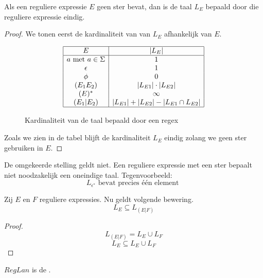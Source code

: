 \documentclass[main.tex]{subfiles}
\begin{document}
\begin{st}
  Als een reguliere expressie $E$ geen ster bevat, dan is de taal $L_{E}$ bepaald door die reguliere expressie eindig.
  
  \begin{proof}
    We tonen eerst de kardinaliteit van van $L_{E}$ afhankelijk van $E$.
    \begin{figure}[H]
      \centering
      \[
      \begin{array}{|c|c|}
        \hline
        E                           & |L_E|\\
        \hline
        a \text{ met } a \in \Sigma & 1\\
        \epsilon                    & 1\\
        \phi                        & 0\\
        (E_1E_2)                    & |L_{E1}| \cdot |L_{E2}|\\
        (E)^{*}                      & \infty\\
        (E_1|E_2)                   & |L_{E1}| + |L_{E2}| - |L_{E1} \cap L_{E2}|\\
        \hline
      \end{array}
      \]
      \caption{Kardinaliteit van de taal bepaald door een regex}
      \label{fig:regex-cardinaliteiten}
    \end{figure}   
    \noindent Zoals we zien in de tabel blijft de kardinaliteit $L_{E}$ eindig zolang we geen ster gebruiken in $E$.
  \end{proof}
\end{st}

\begin{opm}
  De omgekeerde stelling geldt niet.
  Een reguliere expressie met een ster bepaalt niet noodzakelijk een oneindige taal.
  Tegenvoorbeeld:
  \[ L_{\epsilon^{*}} \text{ bevat precies \'e\'en element } \]
\end{opm}

\begin{st}
  Zij $E$ en $F$ reguliere expressies. Nu geldt volgende bewering.
  \[ L_{E} \subseteq L_{(E|F)} \]

  \begin{proof}
    \[ L_{(E|F)} = L_{E} \cup L_{F}\]
    \[ L_{E} \subseteq L_{E} \cup L_{F} \]
  \end{proof}
\end{st}

\begin{de}
  $RegLan$ is de .
\end{de}
\end{document}

